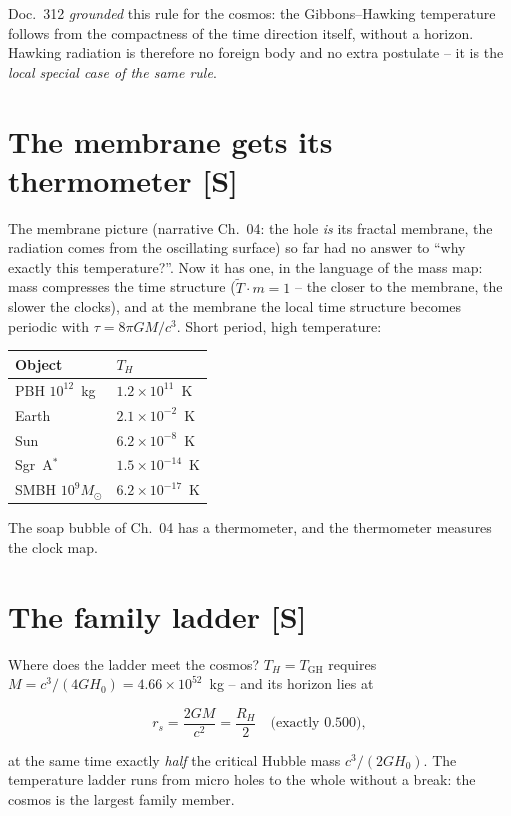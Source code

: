 Doc.~312 \emph{grounded} this rule for the cosmos: the
Gibbons--Hawking temperature follows from the compactness of the
time direction itself, without a horizon. Hawking radiation is
therefore no foreign body and no extra postulate -- it is the
\emph{local special case of the same rule}.

\section{The membrane gets its thermometer [S]}

The membrane picture (narrative Ch.~04: the hole \emph{is} its
fractal membrane, the radiation comes from the oscillating
surface) so far had no answer to \enquote{why exactly this
temperature?}. Now it has one, in the language of the mass map:
mass compresses the time structure ($\tilde T \cdot m = 1$ -- the
closer to the membrane, the slower the clocks), and at the
membrane the local time structure becomes periodic with
$\tau = 8\pi GM/c^3$. Short period, high temperature:

\begin{center}
\begin{tabular}{ll}
\toprule
Object & $T_H$ \\
\midrule
PBH $10^{12}$~kg & $1.2\times10^{11}$~K \\
Earth & $2.1\times10^{-2}$~K \\
Sun & $6.2\times10^{-8}$~K \\
Sgr~A$^{*}$ & $1.5\times10^{-14}$~K \\
SMBH $10^{9}M_\odot$ & $6.2\times10^{-17}$~K \\
\bottomrule
\end{tabular}
\end{center}

The soap bubble of Ch.~04 has a thermometer, and the thermometer
measures the clock map.

\section{The family ladder [S]}

Where does the ladder meet the cosmos? $T_H = T_\text{GH}$
requires $M = c^3/(4GH_0) = 4.66\times10^{52}$~kg -- and its
horizon lies at

\[
  r_s = \frac{2GM}{c^2} = \frac{R_H}{2} \quad\text{(exactly } 0.500\text{)},
\]

at the same time exactly \emph{half} the critical Hubble mass
$c^3/(2GH_0)$. The temperature ladder runs from micro holes to
the whole without a break: the cosmos is the largest family
member.

